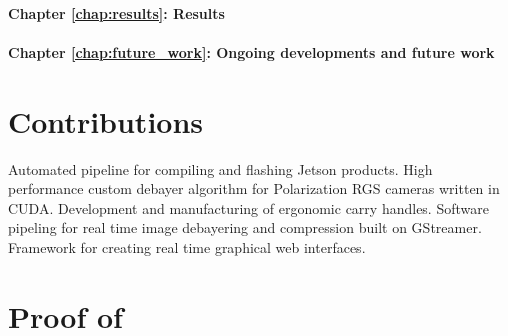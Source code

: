 \paragraph{Chapter \ref{chap:results}: Results}


\paragraph{Chapter \ref{chap:future_work}: Ongoing developments and future work}



\section{Contributions}
Automated pipeline for compiling and flashing Jetson products.
High performance custom debayer algorithm for Polarization RGS cameras written in CUDA.
Development and manufacturing of ergonomic carry handles.
Software pipeling for real time image debayering and compression built on GStreamer.
Framework for creating real time graphical web interfaces.

\section{Proof of }

